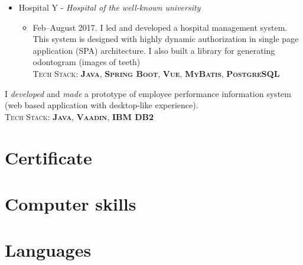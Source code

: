 \documentclass[11pt,a4paper,sans]{moderncv} %
\begin{document}
{\begin{itemize}
\begin{itemize}
  \end{itemize}
  \item Hospital Y - \textit{Hospital of the well-known university}
  \begin{itemize}
      \item Feb--August 2017. I led and developed a hospital management system. This system is designed with highly dynamic authorization in single page application (SPA) architecture. I also built a library for generating odontogram (images of teeth)\\ \textsc{Tech Stack: \textbf{Java}, \textbf{Spring Boot}, \textbf{Vue}, \textbf{MyBatis}, \textbf{PostgreSQL}}
  \end{itemize}
\end{itemize}
}

{
I \textit{developed} and \textit{made} a prototype of employee performance information system (web based application with desktop-like experience).\\
\textsc{Tech Stack: \textbf{Java}, \textbf{Vaadin}, \textbf{IBM DB2}}
}

\section{Certificate}


\section{Computer skills}




\section{Languages}
\begin{small}
\end{small}
\end{document}
